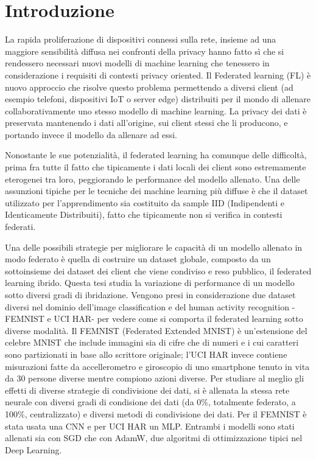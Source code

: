 \chapter*{Introduzione}
La rapida proliferazione di dispositivi connessi sulla rete, insieme 
ad una maggiore sensibilità diffusa nei confronti della privacy 
hanno fatto sì che si rendessero necessari nuovi modelli di machine 
learning che tenessero in considerazione i requisiti di contesti 
privacy oriented. Il Federated learning (FL) è nuovo approccio che 
risolve questo problema permettendo a diversi client (ad esempio
telefoni, dispositivi IoT o server edge) distribuiti per il mondo di 
allenare collaborativamente uno stesso modello di machine learning. La 
privacy dei dati è preservata mantenendo i dati all'origine, sui 
client stessi che li producono, e portando invece il modello da 
allenare ad essi.

Nonostante le sue potenzialità, il federated learning ha comunque delle
difficoltà, prima fra tutte il fatto che tipicamente i dati locali 
dei client sono estremamente eterogenei tra loro, peggiorando le 
performance del modello allenato. Una delle assunzioni tipiche per le 
tecniche dei machine learning più diffuse è che il dataset utilizzato 
per l'apprendimento sia costituito da sample IID (Indipendenti e 
Identicamente Distribuiti), fatto che tipicamente non si verifica in 
contesti federati.

Una delle possibili strategie per migliorare le capacità di un modello 
allenato in modo federato è quella di costruire un dataset globale, 
composto da un sottoinsieme dei dataset dei client che viene condiviso 
e reso pubblico, il federated learning ibrido. Questa tesi studia la 
variazione di performance di un modello sotto diversi gradi di 
ibridazione. Vengono presi in considerazione due dataset diversi nel 
dominio dell'image classification e del human activity recognition 
-FEMNIST e UCI HAR- per vedere come si comporta il federated 
learning sotto diverse modalità. Il FEMNIST (Federated Extended MNIST)
è un'estensione del celebre MNIST che include immagini sia di cifre 
che di numeri e i cui caratteri sono partizionati in base allo scrittore
originale; l'UCI HAR invece contiene misurazioni fatte 
da accellerometro e giroscopio di uno smartphone tenuto in vita da 30
persone diverse mentre compiono azioni diverse. Per studiare al meglio 
gli effetti di diverse strategie di condivisione dei dati, si è 
allenata la stessa rete neurale con diversi gradi di condisione dei 
dati (da 0\%, totalmente federato, a 100\%, centralizzato) e diversi metodi di 
condivisione dei dati. Per il FEMNIST è stata usata una CNN e per UCI 
HAR un MLP. Entrambi i modelli sono stati allenati sia con SGD che 
con AdamW, due algoritmi di ottimizzazione tipici nel Deep Learning.


